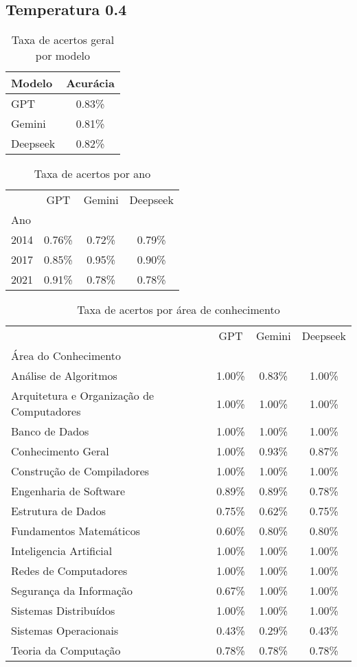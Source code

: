 \subsection{Temperatura 0.4}

\begin{table}[H]
\centering
\caption{Taxa de acertos geral por modelo}
\label{tab:acuracia_geral}
\begin{tabular}{l c}
\toprule
Modelo & Acurácia \\
\midrule
GPT & 0.83\% \\
Gemini & 0.81\% \\
Deepseek & 0.82\% \\
\bottomrule
\end{tabular}
\end{table}

\begin{table}[H]
\centering
\caption{Taxa de acertos por ano}
\label{tab:acuracia_ano}
\begin{tabular}{l c c c}
\toprule
 & GPT & Gemini & Deepseek \\
Ano &  &  &  \\
\midrule
2014 & 0.76\% & 0.72\% & 0.79\% \\
2017 & 0.85\% & 0.95\% & 0.90\% \\
2021 & 0.91\% & 0.78\% & 0.78\% \\
\bottomrule
\end{tabular}
\end{table}

\begin{table}[H]
\centering
\caption{Taxa de acertos por área de conhecimento}
\label{tab:acuracia_area}
\begin{tabular}{l c c c}
\toprule
 & GPT & Gemini & Deepseek \\
Área do Conhecimento &  &  &  \\
\midrule
Análise de Algoritmos & 1.00\% & 0.83\% & 1.00\% \\
Arquitetura e Organização de Computadores & 1.00\% & 1.00\% & 1.00\% \\
Banco de Dados & 1.00\% & 1.00\% & 1.00\% \\
Conhecimento Geral & 1.00\% & 0.93\% & 0.87\% \\
Construção de Compiladores & 1.00\% & 1.00\% & 1.00\% \\
Engenharia de Software & 0.89\% & 0.89\% & 0.78\% \\
Estrutura de Dados & 0.75\% & 0.62\% & 0.75\% \\
Fundamentos Matemáticos & 0.60\% & 0.80\% & 0.80\% \\
Inteligencia Artificial & 1.00\% & 1.00\% & 1.00\% \\
Redes de Computadores & 1.00\% & 1.00\% & 1.00\% \\
Segurança da Informação & 0.67\% & 1.00\% & 1.00\% \\
Sistemas Distribuídos & 1.00\% & 1.00\% & 1.00\% \\
Sistemas Operacionais & 0.43\% & 0.29\% & 0.43\% \\
Teoria da Computação & 0.78\% & 0.78\% & 0.78\% \\
\bottomrule
\end{tabular}
\end{table}
